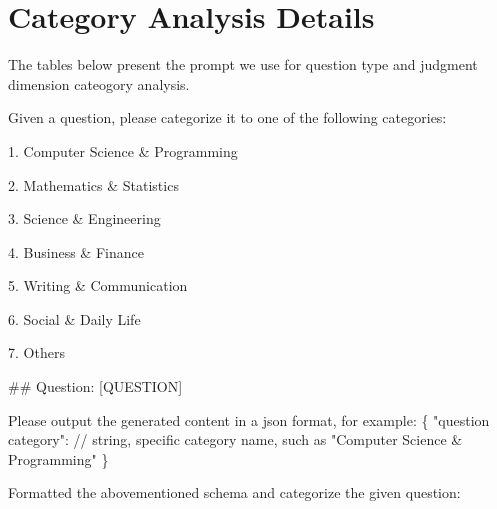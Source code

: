 \documentclass{article} %
\begin{document}
\section{Category Analysis Details}
\label{Category Analysis Details}
The tables below present the prompt we use for question type and judgment dimension cateogory analysis.
\begin{tcolorbox}[breakable, title=Question Type Categorization Prompt, label=More Cases]
\small
\ttfamily
Given a question, please categorize it to one of the following categories:

\vspace{4mm}
1. Computer Science \& Programming

2. Mathematics \& Statistics

3. Science \& Engineering

4. Business \& Finance

5. Writing \& Communication

6. Social \& Daily Life

7. Others

\vspace{4mm}
\#\# Question: [QUESTION]

\vspace{4mm}
Please output the generated content in a json format, for example:
\{
"question category": // string, specific category name, such as "Computer Science \& Programming"
\}

\vspace{4mm}
Formatted the abovementioned schema and categorize the given question:


\end{tcolorbox}
\label{}
\end{document}

